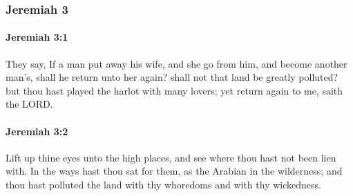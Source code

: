 	\subsubsection{Jeremiah 3} %
		\label{JEREMIAH-3}

		\paragraph{Jeremiah 3:1} %
			\label{JEREMIAH-3-1}

			They say, If a man put away his wife, and she go from him, and become another man’s, shall he return unto her again? shall not that land be greatly polluted? but thou hast played the harlot with many lovers; yet return again to me, saith the LORD.


		\paragraph{Jeremiah 3:2} %
			\label{JEREMIAH-3-2}

			Lift up thine eyes unto the high places, and see where thou hast not been lien with. In the ways hast thou sat for them, as the Arabian in the wilderness; and thou hast polluted the land with thy whoredoms and with thy wickedness.

